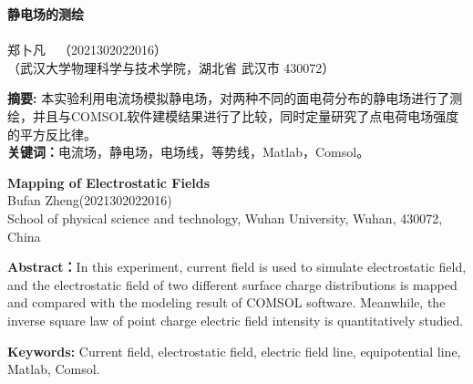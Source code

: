 \documentclass{WHUReport}
\newcommand{\name}{郑卜凡}
\newcommand{\stuid}{2021302022016}
\newcommand{\Name}{Bufan Zheng}
\newcommand{\newtitle}{静电场的测绘}
\newcommand{\Title}{Mapping of Electrostatic Fields}
\begin{document}
\pagestyle{maincontent} 
%

\begin{center}
 \textbf{\newtitle}\\
~\\
 \kaishu \name \ \ （\stuid）\\
 \kaishu （武汉大学物理科学与技术学院，湖北省 武汉市 430072）\\
\end{center}
\textbf{摘\quad 要:}
本实验利用电流场模拟静电场，对两种不同的面电荷分布的静电场进行了测绘，并且与COMSOL软件建模结果进行了比较，同时定量研究了点电荷电场强度的平方反比律。\\
\textbf{关键词：}电流场，静电场，电场线，等势线，Matlab，Comsol。
~\\
\begin{center}
	\textbf{\Title}\\
	 \Name\quad (\stuid)\\
	 School of physical science and technology, Wuhan University, Wuhan, 430072, China
\end{center}

\textbf{Abstract：}In this experiment, current field is used to simulate electrostatic field, and the electrostatic field of two different surface charge distributions is mapped and compared with the modeling result of COMSOL software. Meanwhile, the inverse square law of point charge electric field intensity is quantitatively studied.

\textbf{Keywords: }Current field, electrostatic field, electric field line, equipotential line, Matlab, Comsol.
\end{document}
